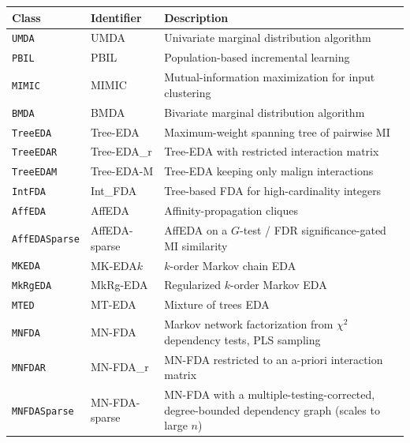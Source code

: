 \documentclass[a4paper,11pt]{article}
\begin{document}
\begin{table}[ht]
\centering
\small
\setlength{\tabcolsep}{4pt}
\begin{tabular}{llp{6.5cm}}
\toprule
\textbf{Class} & \textbf{Identifier} & \textbf{Description} \\
\midrule
\texttt{UMDA} & UMDA & Univariate marginal distribution algorithm
  \citep{Muhlenbein_and_Paas:1996} \\
\texttt{PBIL} & PBIL & Population-based incremental learning \citep{Baluja:1994} \\
\texttt{MIMIC} & MIMIC & Mutual-information maximization for input clustering \citep{DeBonet_et_al:1996} \\
\texttt{BMDA} & BMDA & Bivariate marginal distribution algorithm \citep{Pelikan_and_Muhlenbein:1999}\\
\texttt{TreeEDA} & Tree-EDA & Maximum-weight spanning tree of pairwise MI \citep{Baluja_and_Davies:1997,Pelikan_and_Muhlenbein:1999} \\
\texttt{TreeEDAR} & Tree-EDA\_r & Tree-EDA with restricted interaction matrix \citep{Baluja:2006, Santana_et_al:2007b} \\
\texttt{TreeEDAM} & Tree-EDA-M & Tree-EDA keeping only malign interactions \citep{Santana_et_al:2005int} \\
\texttt{IntFDA} & Int\_FDA & Tree-based FDA for high-cardinality integers \citep{Santana_et_al:2002int} \\
\texttt{AffEDA} & AffEDA & Affinity-propagation cliques \citep{Santana_et_al:2009c} \\
\texttt{AffEDASparse} & AffEDA-sparse & AffEDA on a $G$-test / FDR significance-gated MI similarity \citep{Santana_et_al:2009c} \\
\texttt{MKEDA} & MK-EDA$k$ & $k$-order Markov chain EDA \citep{Santana_et_al:2004} \\
\texttt{MkRgEDA} & MkRg-EDA & Regularized $k$-order Markov EDA \citep{Santana_et_al:2011reg} \\
\texttt{MTED} & MT-EDA & Mixture of trees EDA \citep{Santana_et_al:2001br} \\
\texttt{MNFDA} & MN-FDA & Markov network factorization from $\chi^2$ dependency tests, PLS sampling \citep{Santana:2003c} \\
\texttt{MNFDAR} & MN-FDA\_r & MN-FDA restricted to an a-priori interaction matrix \citep{Santana:2005} \\
\texttt{MNFDASparse} & MN-FDA-sparse & MN-FDA with a multiple-testing-corrected, degree-bounded dependency graph (scales to large $n$) \citep{Santana:2003c} \\

\end{tabular}
\end{table}
\end{document}
